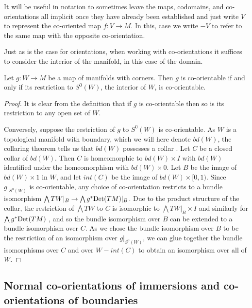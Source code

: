 \begin{notation}\label{N: implicit notation}
	It will be useful in notation to sometimes leave the maps, codomains, and co-orientations all implicit once they have already been established and just write $V$ to represent the co-oriented map $f \colon V \to M$.
	In this, case we write $-V$ to refer to the same map with the opposite co-orientation.
\end{notation}

Just as is the case for orientations, when working with co-orientations it suffices to consider the interior of the manifold, in this case of the domain.

\begin{proposition}\label{P: interior co-orientation}
	Let $g \colon W \to M$ be a map of manifolds with corners. Then $g$ is co-orientable if and only if its restriction to $S^0(W)$, the interior of $W$, is co-orientable.
\end{proposition}
\begin{proof}
	It is clear from the definition that if $g$ is co-orientable then so is its restriction to any open set of $W$.

	Conversely, suppose the restriction of $g$ to $S^0(W)$ is co-orientable. As $W$ is a topological manifold with boundary, which we will here denote $bd(W)$, the collaring theorem tells us that $bd(W)$ possesses a collar \cite[Theorem 2]{Bro62}. Let $C$ be a closed collar of $bd(W)$. Then $C$ is homeomorphic to $bd(W)\times I$ with $bd (W)$ identified under the homeomorphism with $bd(W) \times 0$. Let $B$ be the image of $bd(W) \times 1$ in $W$, and let $int(C)$ be the image of $bd(W) \times [0,1)$. Since $g|_{S^0(W)}$ is co-orientable, any choice of co-orientation restricts to a bundle isomorphism $\bigwedge TW|_B \to \bigwedge g^*{\rm Det}(TM)|_B$. Due to the product structure of the collar, the restriction of $\bigwedge TW$ to $C$ is isomorphic to $\bigwedge TW|_B \times I$ and similarly for $\bigwedge g^*{\rm Det}(TM)$ \cite[Theorem 3.4.4]{Hus94}, and so the bundle isomorphism over $B$ can be extended to a bundle isomorphism over $C$. As we chose the bundle isomorphism over $B$ to be the restriction of an isomorphism over $g|_{S^0(W)}$, we can glue together the bundle isomorphisms over $C$ and over $W-int(C)$ to obtain an isomorphism over all of $W$.
\end{proof}

\subsection{Normal co-orientations of immersions and co-orientations of boundaries}\label{S: normal orientation}

